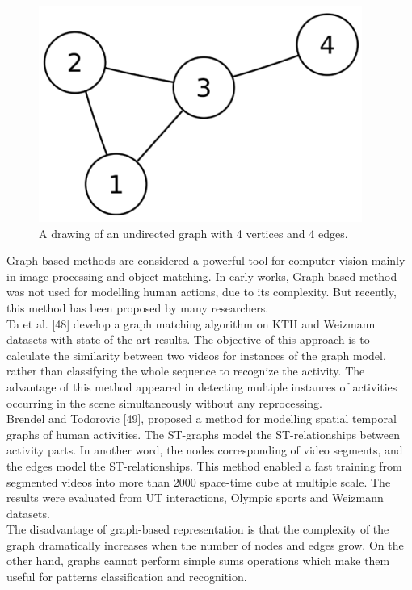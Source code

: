 \begin{figure}[ht]
\centering
\includegraphics{Figures/grr}
\decoRule
\caption[A drawing of an undirected graph with 4 vertices and 4 edges.]{A drawing of an undirected graph with 4 vertices and 4 edges.}
\label{fig:la}
\end{figure}
Graph-based methods are considered a powerful tool for computer vision mainly in image processing and object matching. In early works, Graph based method was not used for modelling human actions, due to its complexity. But recently, this method has been proposed by many researchers. \\

Ta et al. [48] develop a graph matching algorithm on KTH and Weizmann datasets with state-of-the-art results. The objective of this approach is to calculate the similarity between two videos for instances of the graph model, rather than classifying the whole sequence to recognize the activity. The advantage of this method appeared in detecting multiple instances of activities occurring in the scene simultaneously without any reprocessing. \\

Brendel and Todorovic [49], proposed a method for modelling spatial temporal graphs of human activities. The ST-graphs model the ST-relationships between activity parts. In another word, the nodes corresponding of video segments, and the edges model the ST-relationships. This method enabled a fast training from segmented videos into more than 2000 space-time cube at multiple scale. The results were evaluated from UT interactions, Olympic sports and Weizmann datasets. \\

The disadvantage of graph-based representation is that the complexity of the graph dramatically increases when the number of nodes and edges grow. On the other hand, graphs cannot perform simple sums operations which make them useful for patterns classification and recognition.\\

